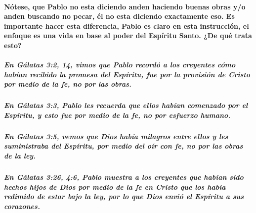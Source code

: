 \documentclass[11a pt,twoside]{article}
\def\textbf#1{#1}%
\let\oldparagraph\paragraph
\renewcommand{\paragraph}{\needspace{3\baselineskip}\oldparagraph}
\let\oldsubparagraph\subparagraph
\renewcommand{\subparagraph}{\needspace{2\baselineskip}\oldsubparagraph}
\begin{document}
\paragraph{Nótese, que Pablo no esta diciendo anden haciendo buenas
obras y/o anden buscando no pecar, él no esta diciendo exactamente eso.
Es importante hacer esta diferencia, Pablo es claro en esta instrucción,
el enfoque es una vida en base al poder del Espíritu Santo. ¿De qué
trata
esto?}\label{nuxf3tese-que-pablo-no-esta-diciendo-anden-haciendo-buenas-obras-yo-anden-buscando-no-pecar-uxe9l-no-esta-diciendo-exactamente-eso.-es-importante-hacer-esta-diferencia-pablo-es-claro-en-esta-instrucciuxf3n-el-enfoque-es-una-vida-en-base-al-poder-del-espuxedritu-santo.-de-quuxe9-trata-esto}

\subparagraph{En Gálatas 3:2, 14, vimos que Pablo recordó a los
creyentes cómo habían recibido la promesa del Espíritu, fue por la
provisión de Cristo por medio de la fe, no por las
obras.}\label{en-guxe1latas-32-14-vimos-que-pablo-recorduxf3-a-los-creyentes-cuxf3mo-habuxedan-recibido-la-promesa-del-espuxedritu-fue-por-la-provisiuxf3n-de-cristo-por-medio-de-la-fe-no-por-las-obras.}

\subparagraph{\texorpdfstring{En Gálatas 3:3, Pablo les recuerda que
ellos habían \textbf{comenzado por el Espíritu}, y esto fue por medio de
la fe, no por esfuerzo
humano.}{En Gálatas 3:3, Pablo les recuerda que ellos habían comenzado por el Espíritu, y esto fue por medio de la fe, no por esfuerzo humano.}}\label{en-guxe1latas-33-pablo-les-recuerda-que-ellos-habuxedan-comenzado-por-el-espuxedritu-y-esto-fue-por-medio-de-la-fe-no-por-esfuerzo-humano.}

\subparagraph{En Gálatas 3:5, vemos que Dios había milagros entre ellos
y les suministraba del Espíritu, por medio del oír con fe, no por las
obras de la
ley.}\label{en-guxe1latas-35-vemos-que-dios-habuxeda-milagros-entre-ellos-y-les-suministraba-del-espuxedritu-por-medio-del-ouxedr-con-fe-no-por-las-obras-de-la-ley.}

\subparagraph{En Gálatas 3:26, 4:6, Pablo muestra a los creyentes que
habían sido hechos hijos de Dios por medio de la fe en Cristo que los
había redimido de estar bajo la ley, por lo que Dios envió el Espíritu a
sus
corazones.}\label{en-guxe1latas-326-46-pablo-muestra-a-los-creyentes-que-habuxedan-sido-hechos-hijos-de-dios-por-medio-de-la-fe-en-cristo-que-los-habuxeda-redimido-de-estar-bajo-la-ley-por-lo-que-dios-enviuxf3-el-espuxedritu-a-sus-corazones.}
\end{document}
